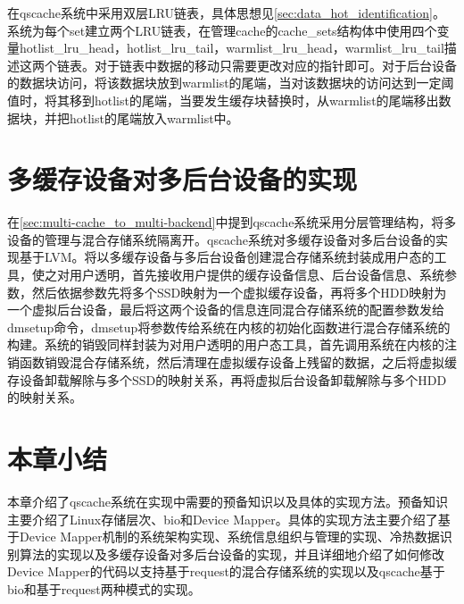 在qscache系统中采用双层LRU链表，具体思想见\ref{sec:data_hot_identification}。系统为每个set建立两个LRU链表，在管理cache的cache\_sets结构体中使用四个变量hotlist\_lru\_head，hotlist\_lru\_tail，warmlist\_lru\_head，warmlist\_lru\_tail描述这两个链表。对于链表中数据的移动只需要更改对应的指针即可。对于后台设备的数据块访问，将该数据块放到warmlist的尾端，当对该数据块的访问达到一定阈值时，将其移到hotlist的尾端，当要发生缓存块替换时，从warmlist的尾端移出数据块，并把hotlist的尾端放入warmlist中。

\section{多缓存设备对多后台设备的实现}

在\ref{sec:multi-cache_to_multi-backend}中提到qscache系统采用分层管理结构，将多设备的管理与混合存储系统隔离开。qscache系统对多缓存设备对多后台设备的实现基于LVM。将以多缓存设备与多后台设备创建混合存储系统封装成用户态的工具，使之对用户透明，首先接收用户提供的缓存设备信息、后台设备信息、系统参数，然后依据参数先将多个SSD映射为一个虚拟缓存设备，再将多个HDD映射为一个虚拟后台设备，最后将这两个设备的信息连同混合存储系统的配置参数发给dmsetup命令，dmsetup将参数传给系统在内核的初始化函数进行混合存储系统的构建。系统的销毁同样封装为对用户透明的用户态工具，首先调用系统在内核的注销函数销毁混合存储系统，然后清理在虚拟缓存设备上残留的数据，之后将虚拟缓存设备卸载解除与多个SSD的映射关系，再将虚拟后台设备卸载解除与多个HDD的映射关系。


\section{本章小结}
本章介绍了qscache系统在实现中需要的预备知识以及具体的实现方法。预备知识主要介绍了Linux存储层次、bio和Device Mapper。具体的实现方法主要介绍了基于Device Mapper机制的系统架构实现、系统信息组织与管理的实现、冷热数据识别算法的实现以及多缓存设备对多后台设备的实现，并且详细地介绍了如何修改Device Mapper的代码以支持基于request的混合存储系统的实现以及qscache基于bio和基于request两种模式的实现。